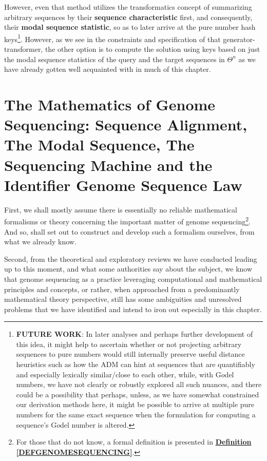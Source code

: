 \documentclass[a4paper, 18pt]{book} %
\begin{document}
   However, even that method utilizes the transformatics concept of summarizing arbitrary sequences by their \textbf{sequence characteristic} first, and consequently, their \textbf{modal sequence statistic}, so as to later arrive at the pure number hash keys\footnote{\textbf{FUTURE WORK}: In later analyses and perhaps further development of this idea, it might help to ascertain whether or not projecting arbitrary sequences to pure numbers would still internally preserve useful distance heuristics such as how the ADM can hint at sequences that are quantifiably and especially lexically similar/close to each other, while, with G$\ddot{o}$del numbers, we have not clearly or robustly explored all such nuances, and there could be a possibility that perhaps, unless, as we have somewhat constrained our derivation methods here, it might be possible to arrive at multiple pure numbers for the same exact sequence when the formulation for computing a sequence's  G$\ddot{o}$del number is altered.}. However, as we see in the constraints and specification of that generator-transformer, the other option is to compute the solution using keys based on just the modal sequence statistics of the query and the target sequences in $\Theta^n$ as we have already gotten well acquainted with in much of this chapter.



\chapter{The Mathematics of Genome Sequencing: Sequence Alignment, The Modal Sequence, The Sequencing Machine and the Identifier Genome Sequence Law}
\label{SECMATHSEQ}



First, we shall mostly assume there is essentially no reliable mathematical formalisms or theory concerning the important matter of genome sequencing\footnote{For those that do not know, a formal definition is presented in \textbf{\hyperref[DEFGENOMESEQUENCING]{Definition \ref{DEFGENOMESEQUENCING}}}.}. And so, shall set out to construct and develop such a formalism ourselves, from what we already know.

Second, from the theoretical and exploratory reviews we have conducted leading up to this moment, and what some authorities\cite{przytycka_wgs_lecture10} say about the subject, we know that genome sequencing as a practice leveraging computational and mathematical principles and concepts, or rather, when approached from a predominantly mathematical theory perspective, still has some ambiguities and unresolved problems that we have identified and intend to iron out especially in this chapter.
\end{document}
